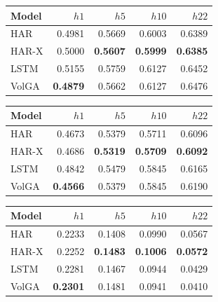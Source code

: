\begin{tabular}{lrrrr}
\toprule
Model & $h1$ & $h5$ & $h10$ & $h22$ \\
\midrule
HAR & 0.4981 & 0.5669 & 0.6003 & 0.6389 \\
HAR-X & 0.5000 & \textbf{0.5607} & \textbf{0.5999} & \textbf{0.6385} \\
LSTM & 0.5155 & 0.5759 & 0.6127 & 0.6452 \\
VolGA & \textbf{0.4879} & 0.5662 & 0.6127 & 0.6476 \\
\bottomrule
\end{tabular}

\begin{tabular}{lrrrr}
\toprule
Model & $h1$ & $h5$ & $h10$ & $h22$ \\
\midrule
HAR & 0.4673 & 0.5379 & 0.5711 & 0.6096 \\
HAR-X & 0.4686 & \textbf{0.5319} & \textbf{0.5709} & \textbf{0.6092} \\
LSTM & 0.4842 & 0.5479 & 0.5845 & 0.6165 \\
VolGA & \textbf{0.4566} & 0.5379 & 0.5845 & 0.6190 \\
\bottomrule
\end{tabular}

\begin{tabular}{lrrrr}
\toprule
Model & $h1$ & $h5$ & $h10$ & $h22$ \\
\midrule
HAR & 0.2233 & 0.1408 & 0.0990 & 0.0567 \\
HAR-X & 0.2252 & \textbf{0.1483} & \textbf{0.1006} & \textbf{0.0572} \\
LSTM & 0.2281 & 0.1467 & 0.0944 & 0.0429 \\
VolGA & \textbf{0.2301} & 0.1481 & 0.0941 & 0.0410 \\
\bottomrule
\end{tabular}
